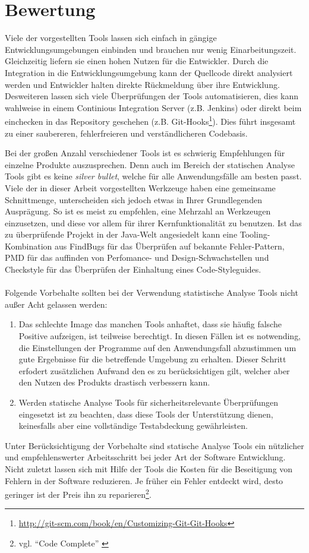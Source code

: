 \section{Bewertung}
Viele der vorgestellten Tools lassen sich einfach in gängige Entwicklungsumgebungen einbinden und brauchen nur wenig Einarbeitungszeit. Gleichzeitig liefern sie einen hohen Nutzen für die Entwickler. 
Durch die Integration in die Entwicklungsumgebung kann der Quellcode direkt analysiert werden und Entwickler halten direkte Rückmeldung über ihre Entwicklung. Desweiteren lassen sich viele Überprüfungen der Tools automatisieren, dies kann wahlweise in einem Continious Integration Server (z.B. Jenkins) oder direkt beim einchecken in das Repository geschehen (z.B. Git-Hooks\footnote{\url{http://git-scm.com/book/en/Customizing-Git-Git-Hooks}}). Dies führt insgesamt zu einer saubereren, fehlerfreieren und verständlicheren Codebasis.

Bei der großen Anzahl verschiedener Tools ist es schwierig Empfehlungen für einzelne Produkte auszusprechen. Denn auch im Bereich der statischen Analyse Tools gibt es keine \emph{silver bullet}, welche für alle Anwendungsfälle am besten passt. Viele der in dieser Arbeit vorgestellten Werkzeuge haben eine gemeinsame Schnittmenge, unterscheiden sich jedoch etwas in Ihrer Grundlegenden Ausprägung. So ist es meist zu empfehlen, eine Mehrzahl an Werkzeugen einzusetzen, und diese vor allem für ihrer Kernfunktionalität zu benutzen.
Ist das zu überprüfende Projekt in der Java-Welt angesiedelt kann eine Tooling-Kombination aus FindBugs für das Überprüfen auf bekannte Fehler-Pattern, PMD für das auffinden von Perfomance- und Design-Schwachstellen und Checkstyle für das Überprüfen der Einhaltung eines Code-Styleguides.\\\\

Folgende Vorbehalte sollten bei der Verwendung statistische Analyse Tools nicht außer Acht gelassen werden:
\begin{enumerate}
  \item Das schlechte Image das manchen Tools anhaftet, dass sie häufig falsche Positive aufzeigen, ist teilweise berechtigt. In diesen Fällen ist es notwending, die Einstellungen der Programme auf den Anwendungsfall abzustimmen um gute Ergebnisse für die betreffende Umgebung zu erhalten. Dieser Schritt erfodert zusätzlichen Aufwand den es zu berücksichtigen gilt, welcher aber den Nutzen des Produkts drastisch verbessern kann.
  \item Werden statische Analyse Tools für sicherheitsrelevante Überprüfungen eingesetzt ist zu beachten, dass diese Tools der Unterstützung dienen, keinesfalls aber eine vollständige Testabdeckung gewährleisten.
\end{enumerate}

Unter Berücksichtigung der Vorbehalte sind statische Analyse Tools ein nützlicher und empfehlenswerter Arbeitsschritt bei jeder  Art der Software Entwicklung. Nicht zuletzt lassen sich mit Hilfe der Tools die Kosten für die Beseitigung von Fehlern in der Software reduzieren. Je früher ein Fehler entdeckt wird, desto geringer ist der Preis ihn zu reparieren\footnote{vgl. ``Code Complete'' \citep{mcconnell2004}}.
